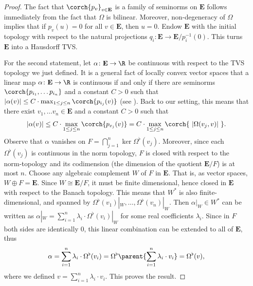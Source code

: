\begin{proof}
    The fact that \(\corch{p_v}_{v \in \mathbf{E}}\) is a family of seminorms on \(\mathbf{E}\) follows immediately from the fact that \(\Omega\) is bilinear. Moreover, non-degeneracy of \(\Omega\) implies that if \(p_v(u)=0\) for all \(v\in \mathbf{E}\), then \(u=0\). Endow \(\mathbf{E}\) with the initial topology with respect to the natural projections \(q_i\colon \mathbf{E}\to \mathbf{E}/p_i^{-1}(0)\). This turns \(\mathbf{E}\) into a Hausdorff TVS. 

    For the second statement, let \(\alpha\colon \mathbf{E} \to \R\) be continuous with respect to the TVS topology we just defined. It is a general fact of locally convex vector spaces that a linear map \(\alpha \colon \mathbf{E} \to \R\) is continuous if and only if there are seminorms \(\corch{p_{i_1}, \ldots p_{i_n}}\) and a constant \(C>0\) such that \(|\alpha(v)| \leq C \cdot \max_{1 \leq j \leq n} \corch{p_{i_j}(v)}\) (see \parencite[Lemma 1.4.2 and Lemma 3.4.2]{Andreas}). Back to our setting, this means that there exist \(v_1, \ldots v_n \in \mathbf{E}\) and a constant \(C>0\) such that 
    \[
    |\alpha(v)| \leq C \cdot  \max_{1 \leq j \leq n} \corch{p_{v_j}(v)}=C \cdot \max_{1 \leq j \leq n} \corch{\ |\Omega(v_j, v)|\ }.
    \]
    Observe that \(\alpha\) vanishes on \(F=\bigcap_{j=1}^n\ker \Omega^\flat(v_j).\) Moreover, since each \(\Omega^\flat(v_j)\) is continuous in the norm topology, \(F\) is closed with respect to the norm-topology and its codimension (the dimension of the quotient \(\mathbf{E}/F\)) is at most \(n\). Choose any algebraic complement \(W\) of \(F\) in \(\mathbf{E}\). That is, as vector spaces, \(W \oplus F=\mathbf{E}\). Since \(W \cong \mathbf{E}/F\), it must be finite dimensional, hence closed in \(\mathbf{E}\) with respect to the Banach topology. This means that \(W^*\) is also finite-dimensional, and spanned by \(\Omega^\flat(v_1)|_W, \ldots, \Omega^\flat(v_n)|_W\). Then \(\alpha |_W \in W^*\) can be written as \(\alpha|_W=\sum_{i=1}^n \lambda_i \cdot \Omega^\flat(v_i)|_W\) for some real coefficients \(\lambda_i\). Since in \(F\) both sides are identically \(0\), this linear combination can be extended to all of \(\mathbf{E}\), thus
    \[
    \alpha = \sum_{i=1}^n \lambda_i \cdot \Omega^\flat(v_i)= \Omega^\flat\parent{\sum_{i=1}^n \lambda_i \cdot v_i}=\Omega^\flat(v),
    \]
    where we defined \(v=\sum_{i=1}^n \lambda_i \cdot v_i\). This proves the result.
\end{proof}

